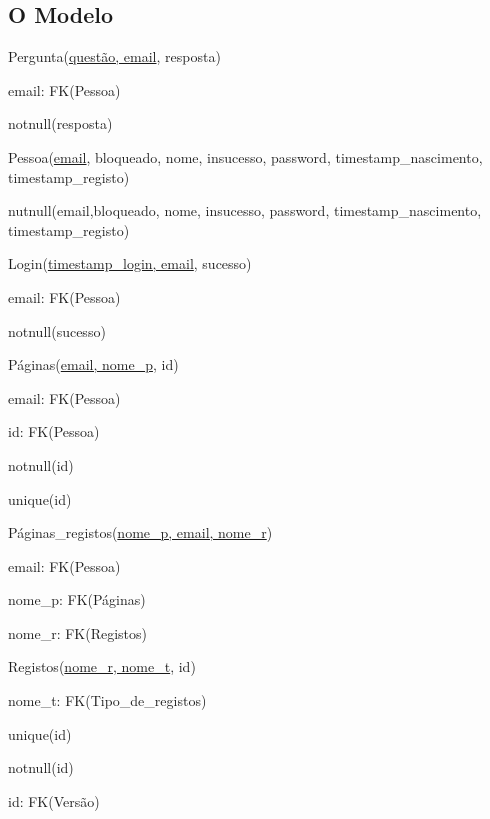 \documentclass[11pt,a4paper]{article}
\begin{document}
\subsection{O Modelo}

\begin{description}[noitemsep]
	\item Pergunta(\underline{quest\~ao, email}, resposta)
	\item email: FK(Pessoa)
	\item notnull(resposta)
\end{description}

\begin{description}[noitemsep]
	\item Pessoa(\underline{email}, bloqueado, nome, insucesso, password, timestamp\_nascimento, timestamp\_registo)
	\item nutnull(email,bloqueado, nome, insucesso, password, timestamp\_nascimento, timestamp\_registo)
\end{description}

\begin{description}[noitemsep]
	\item Login(\underline{timestamp\_login, email}, sucesso)
	\item email: FK(Pessoa)
	\item notnull(sucesso)
\end{description}

\begin{description}[noitemsep]
	\item P\'{a}ginas(\underline{email, nome\_p}, id)
	\item email: FK(Pessoa)
	\item id: FK(Pessoa)
	\item notnull(id)
	\item unique(id)
\end{description}

\begin{description}[noitemsep]
	\item P\'{a}ginas\_registos(\underline{nome\_p, email, nome\_r})
	\item email: FK(Pessoa)
	\item nome\_p: FK(P\'{a}ginas)
	\item nome\_r: FK(Registos)
\end{description}

\begin{description}[noitemsep]
	\item Registos(\underline{nome\_r, nome\_t}, id)
	\item nome\_t: FK(Tipo\_de\_registos)
	\item unique(id)
	\item notnull(id)
	\item id: FK(Vers\~{a}o)
\end{description}
\end{document}

